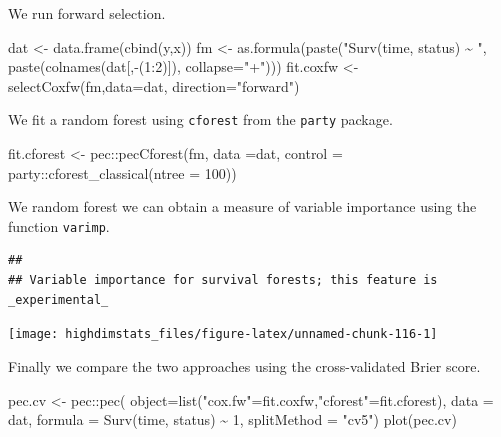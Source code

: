 \documentclass[
]{book}
\newenvironment{Shaded}{\begin{snugshade}}{\end{snugshade}}
\newcommand{\AttributeTok}[1]{\textcolor[rgb]{0.77,0.63,0.00}{#1}}
\newcommand{\DecValTok}[1]{\textcolor[rgb]{0.00,0.00,0.81}{#1}}
\newcommand{\FunctionTok}[1]{\textcolor[rgb]{0.00,0.00,0.00}{#1}}
\newcommand{\NormalTok}[1]{#1}
\newcommand{\OtherTok}[1]{\textcolor[rgb]{0.56,0.35,0.01}{#1}}
\newcommand{\SpecialCharTok}[1]{\textcolor[rgb]{0.00,0.00,0.00}{#1}}
\newcommand{\StringTok}[1]{\textcolor[rgb]{0.31,0.60,0.02}{#1}}
\begin{document}
We run forward selection.

\begin{Shaded}
\begin{Highlighting}[]
\NormalTok{dat }\OtherTok{\textless{}{-}} \FunctionTok{data.frame}\NormalTok{(}\FunctionTok{cbind}\NormalTok{(y,x))}
\NormalTok{fm }\OtherTok{\textless{}{-}} \FunctionTok{as.formula}\NormalTok{(}\FunctionTok{paste}\NormalTok{(}\StringTok{"Surv(time, status) \textasciitilde{} "}\NormalTok{, }
                       \FunctionTok{paste}\NormalTok{(}\FunctionTok{colnames}\NormalTok{(dat[,}\SpecialCharTok{{-}}\NormalTok{(}\DecValTok{1}\SpecialCharTok{:}\DecValTok{2}\NormalTok{)]), }
                             \AttributeTok{collapse=}\StringTok{"+"}\NormalTok{)))}
\NormalTok{fit.coxfw }\OtherTok{\textless{}{-}} \FunctionTok{selectCoxfw}\NormalTok{(fm,}\AttributeTok{data=}\NormalTok{dat,}
                         \AttributeTok{direction=}\StringTok{"forward"}\NormalTok{)}
\end{Highlighting}
\end{Shaded}

We fit a random forest using \texttt{cforest} from the \texttt{party} package.

\begin{Shaded}
\begin{Highlighting}[]
\NormalTok{fit.cforest }\OtherTok{\textless{}{-}}\NormalTok{ pec}\SpecialCharTok{::}\FunctionTok{pecCforest}\NormalTok{(fm, }\AttributeTok{data =}\NormalTok{dat, }
                               \AttributeTok{control =}\NormalTok{ party}\SpecialCharTok{::}\FunctionTok{cforest\_classical}\NormalTok{(}\AttributeTok{ntree =} \DecValTok{100}\NormalTok{))}
\end{Highlighting}
\end{Shaded}

We random forest we can obtain a measure of variable importance using the function \texttt{varimp}.

\begin{verbatim}
## 
## Variable importance for survival forests; this feature is _experimental_
\end{verbatim}

\begin{center}\texttt{[image: highdimstats\_files/figure-latex/unnamed-chunk-116-1]} \end{center}

Finally we compare the two approaches using the cross-validated Brier score.

\begin{Shaded}
\begin{Highlighting}[]
\NormalTok{pec.cv }\OtherTok{\textless{}{-}}\NormalTok{ pec}\SpecialCharTok{::}\FunctionTok{pec}\NormalTok{(}
  \AttributeTok{object=}\FunctionTok{list}\NormalTok{(}\StringTok{"cox.fw"}\OtherTok{=}\NormalTok{fit.coxfw,}\StringTok{"cforest"}\OtherTok{=}\NormalTok{fit.cforest), }
  \AttributeTok{data =}\NormalTok{ dat, }
  \AttributeTok{formula =} \FunctionTok{Surv}\NormalTok{(time, status) }\SpecialCharTok{\textasciitilde{}} \DecValTok{1}\NormalTok{, }
  \AttributeTok{splitMethod =} \StringTok{"cv5"}\NormalTok{)}
\FunctionTok{plot}\NormalTok{(pec.cv)}
\end{Highlighting}
\end{Shaded}
\end{document}
